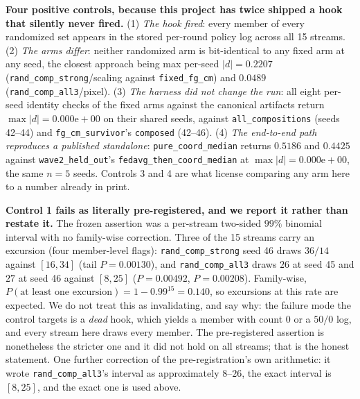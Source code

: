 \documentclass{article}
\begin{document}
\textbf{Four positive controls, because this project has twice shipped a hook that silently never
fired.} (1) \emph{The hook fired}: every member of every randomized set appears in the stored per-round
policy log across all 15 streams. (2) \emph{The arms differ}: neither randomized arm is bit-identical to
any fixed arm at any seed, the closest approach being max per-seed $|d| = 0.2207$
(\texttt{rand\_comp\_strong}/scaling against \texttt{fixed\_fg\_cm}) and $0.0489$
(\texttt{rand\_comp\_all3}/pixel). (3) \emph{The harness did not change the run}: all eight per-seed
identity checks of the fixed arms against the canonical artifacts return $\max|d| = 0.000\mathrm{e}{+}00$
on their shared seeds, against \texttt{all\_compositions} (seeds 42--44) and \texttt{fg\_cm\_survivor}'s
\texttt{composed} (42--46). (4) \emph{The end-to-end path reproduces a published standalone}:
\texttt{pure\_coord\_median} returns $0.5186$ and $0.4425$ against
\texttt{wave2\_held\_out}'s \texttt{fedavg\_then\_coord\_median} at
$\max|d| = 0.000\mathrm{e}{+}00$, the same $n=5$ seeds. Controls 3 and 4 are what license comparing any
arm here to a number already in print.

\textbf{Control 1 fails as literally pre-registered, and we report it rather than restate it.} The
frozen assertion was a per-stream two-sided $99\%$ binomial interval with no family-wise correction. Three
of the 15 streams carry an excursion (four member-level flags):
\texttt{rand\_comp\_strong} seed 46 draws $36/14$ against $[16,34]$ (tail $P=0.00130$), and
\texttt{rand\_comp\_all3} draws $26$ at seed 45 and $27$ at seed 46 against $[8,25]$
($P=0.00492$, $P=0.00208$). Family-wise, $P(\text{at least one excursion}) = 1 - 0.99^{15} = 0.140$, so
excursions at this rate are expected. We do not treat this as invalidating, and say why: the failure mode
the control targets is a \emph{dead} hook, which yields a member with count $0$ or a $50/0$ log, and every
stream here draws every member. The pre-registered assertion is nonetheless the stricter one and it did
not hold on all streams; that is the honest statement. One further correction of the pre-registration's
own arithmetic: it wrote \texttt{rand\_comp\_all3}'s interval as approximately $8$--$26$, the exact
interval is $[8,25]$, and the exact one is used above.
\end{document}
